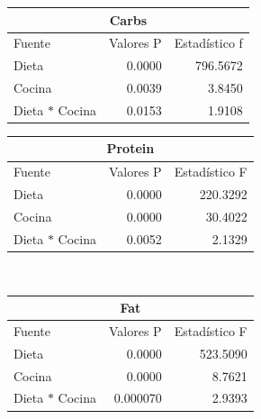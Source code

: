 \documentclass[12pt,a4paper]{article}
\begin{document}
{{            \begin{center}
                \begin{tabular}{lrr}
                \toprule
                    \multicolumn{3}{c}{Carbs} \\
                \midrule
                    Fuente & Valores P & Estadístico f \\
                \midrule
                    Dieta               & 0.0000 & 796.5672 \\
                    Cocina              & 0.0039 &   3.8450 \\
                    Dieta $\ast$ Cocina & 0.0153 &   1.9108 \\
                \bottomrule
                \end{tabular}
                \vspace*{0.5cm}
                \begin{tabular}{lrr}
                    \toprule
                    \multicolumn{3}{c}{Protein} \\
                \midrule
                    Fuente & Valores P & Estadístico F \\
                \midrule
                    Dieta               & 0.0000 & 220.3292 \\
                    Cocina              & 0.0000 &  30.4022 \\
                    Dieta $\ast$ Cocina & 0.0052 &   2.1329 \\
                \bottomrule
                \end{tabular}\\
                \vspace*{0.1cm}
                \begin{tabular}{lrr}
                    \toprule
                    \multicolumn{3}{c}{Fat} \\
                \midrule
                    Fuente & Valores P & Estadístico F \\
                \midrule
                    Dieta               & 0.0000   & 523.5090 \\
                    Cocina              & 0.0000   &   8.7621 \\
                    Dieta $\ast$ Cocina & 0.000070 &   2.9393 \\
                \bottomrule
                \end{tabular}
            \end{center}

}}
\end{document}
